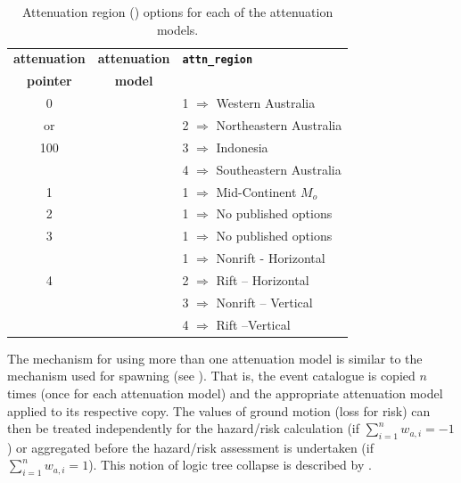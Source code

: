 \begin{table}
\caption{Attenuation region ()
options for each of the attenuation models.} \vspace{0.8em}
\label{tab:attn-regions}
\begin{center}
\begin{tabular}{|c|c|l|}
\hline \textbf{attenuation} & \textbf{attenuation} & \textbf{\texttt{attn\_region}} \\
\textbf{pointer} & \textbf{model} & \textbf{} \\
\hline
0   &  & 1 $\Rightarrow$ Western Australia  \\
or & \cite{dr_Gaull90a} & 2 $\Rightarrow$ Northeastern Australia\\
100 & & 3 $\Rightarrow$ Indonesia\\
 & & 4 $\Rightarrow$ Southeastern Australia\\
\hline
1 & \cite{dr_Toro97a} & 1 $\Rightarrow$ Mid-Continent $M_o$ \\
\hline
2 & \cite{dr_Atkinson97a} & 1 $\Rightarrow$ No published options \\
\hline
3 & \cite{dr_Sadigh97a} & 1 $\Rightarrow$ No published options \\
\hline
 &  & 1 $\Rightarrow$ Nonrift - Horizontal\\
4 & \cite{dr_Somerville01a} & 2 $\Rightarrow$ Rift -- Horizontal\\
 & & 3 $\Rightarrow$ Nonrift -- Vertical\\
 & & 4 $\Rightarrow$ Rift --Vertical\\
\hline
\end{tabular}
\end{center}
\end{table}

The mechanism for using more than one attenuation model is similar
to the mechanism used for spawning (see
). That is, the event catalogue is
copied $n$ times (once for each attenuation model) and the
appropriate attenuation model applied to its respective copy. The
values of ground motion (loss for risk) can then be treated
independently for the hazard/risk calculation (if
$\sum_{i=1}^{n}w_{a,i} = -1$) or aggregated before the hazard/risk
assessment is undertaken (if $\sum_{i=1}^{n}w_{a,i} = 1$). This
notion of logic tree collapse is described by
.















